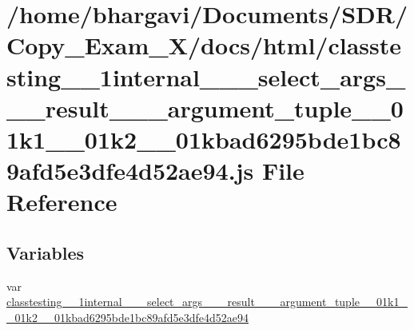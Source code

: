 \hypertarget{classtesting__1__1internal__1__1__select__args__3__01__result__00__01__argument__tuple__00__01k130a8f6dfe2a0977892b420f28f328b36}{}\section{/home/bhargavi/\+Documents/\+S\+D\+R/\+Copy\+\_\+\+Exam\+\_\+X/docs/html/classtesting\+\_\+\_\+1internal\+\_\+\_\+\_\+select\+\_\+args\+\_\+\_\+\_\+result\+\_\+\_\+\_\+argument\+\_\+tuple\+\_\+\_\+01k1\+\_\+\_\+01k2\+\_\+\_\+01kbad6295bde1bc89afd5e3dfe4d52ae94.js File Reference}
\label{classtesting__1__1internal__1__1__select__args__3__01__result__00__01__argument__tuple__00__01k130a8f6dfe2a0977892b420f28f328b36}
\subsection*{Variables}
\begin{DoxyCompactItemize}
\item 
var \hyperlink{classtesting__1__1internal__1__1__select__args__3__01__result__00__01__argument__tuple__00__01k130a8f6dfe2a0977892b420f28f328b36_a769d1d9bbc63e7880c6fcfe1162dcc05}{classtesting\+\_\+\_\+1internal\+\_\+\_\+\_\+select\+\_\+args\+\_\+\_\+\_\+result\+\_\+\_\+\_\+argument\+\_\+tuple\+\_\+\_\+01k1\+\_\+\_\+01k2\+\_\+\_\+01kbad6295bde1bc89afd5e3dfe4d52ae94}
\end{DoxyCompactItemize}



